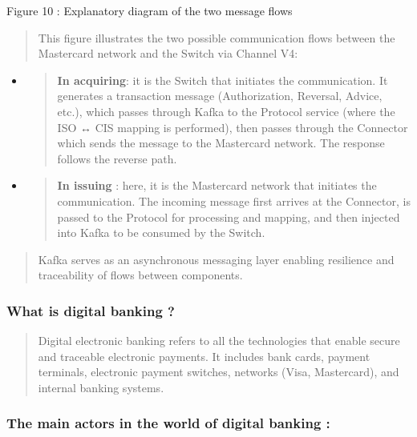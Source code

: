 \documentclass[12pt,a4paper]{report}
\begin{document}
\protect\hypertarget{_Toc201954486}{}{}Figure 10 : Explanatory diagram
of the two message flows

\begin{quote}
This figure illustrates the two possible communication flows between the
Mastercard network and the Switch via Channel V4:
\end{quote}

\begin{itemize}
\item
  \begin{quote}
  \textbf{In acquiring}: it is the Switch that initiates the
  communication. It generates a transaction message (Authorization,
  Reversal, Advice, etc.), which passes through Kafka to the Protocol
  service (where the ISO ↔ CIS mapping is performed), then passes
  through the Connector which sends the message to the Mastercard
  network. The response follows the reverse path.
  \end{quote}
\item
  \begin{quote}
  \textbf{In issuing} : here, it is the Mastercard network that
  initiates the communication. The incoming message first arrives at the
  Connector, is passed to the Protocol for processing and mapping, and
  then injected into Kafka to be consumed by the Switch.
  \end{quote}
\end{itemize}

\begin{quote}
Kafka serves as an asynchronous messaging layer enabling resilience and
traceability of flows between components.
\end{quote}

\hypertarget{what-is-digital-banking}{%
\subsubsection{\texorpdfstring{\textbf{What is digital banking
?}}{What is digital banking ?}}\label{what-is-digital-banking}}

\begin{quote}
Digital electronic banking refers to all the technologies that enable
secure and traceable electronic payments. It includes bank cards,
payment terminals, electronic payment switches, networks (Visa,
Mastercard), and internal banking systems.
\end{quote}

\hypertarget{the-main-actors-in-the-world-of-digital-banking}{%
\subsubsection{\texorpdfstring{\textbf{The main actors in the world of
digital banking
:}}{The main actors in the world of digital banking :}}\label{the-main-actors-in-the-world-of-digital-banking}}
\end{document}
